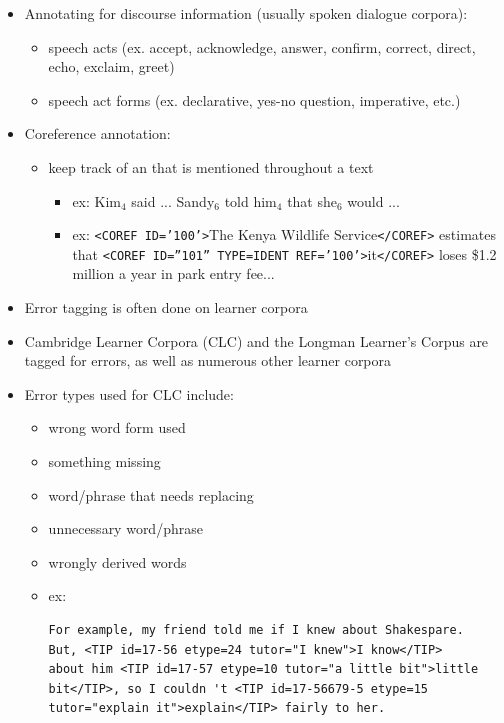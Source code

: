 \documentclass[a4paper,landscape,headrule,footrule,xetex]{foils}
\begin{document}
\begin{itemize}
\item  Annotating for discourse information (usually spoken
  dialogue corpora):
  \begin{itemize}
  \item  speech acts (ex. accept, acknowledge, answer, confirm, correct, direct,
    echo, exclaim, greet)
  \item  speech act forms (ex. declarative, yes-no question, imperative, etc.)
  \end{itemize}
\item  Coreference annotation:
  \begin{itemize}
  \item  keep track of an  that is mentioned throughout a text
    \begin{itemize}
    \item  ex: Kim$_4$ said ... Sandy$_6$ told him$_4$ that she$_6$ would ...
    \item  ex: \texttt{<COREF ID='100'>}The Kenya Wildlife Service\texttt{</COREF>} estimates
      that \texttt{<COREF ID=”101” TYPE=IDENT REF='100'>}it\texttt{</COREF>} loses \$1.2
      million a year in park entry fee...
    \end{itemize}
  \end{itemize}
\end{itemize}

\begin{itemize}
\item  Error tagging is often done on learner corpora
\item  Cambridge Learner Corpora (CLC) and the Longman Learner’s Corpus
are tagged for errors, as well as numerous other learner corpora
\item  Error types used for CLC include:
  \begin{itemize}
  \item  wrong word form used
  \item  something missing
  \item  word/phrase that needs replacing
  \item  unnecessary word/phrase
  \item  wrongly derived words
  \item  ex: 
    \begin{small}
\begin{verbatim}
For example, my friend told me if I knew about Shakespare. 
But, <TIP id=17-56 etype=24 tutor="I knew">I know</TIP> 
about him <TIP id=17-57 etype=10 tutor="a little bit">little 
bit</TIP>, so I couldn 't <TIP id=17-56679-5 etype=15 
tutor="explain it">explain</TIP> fairly to her.
\end{verbatim}
    \end{small}

  \end{itemize}
\end{itemize}
\end{document}
